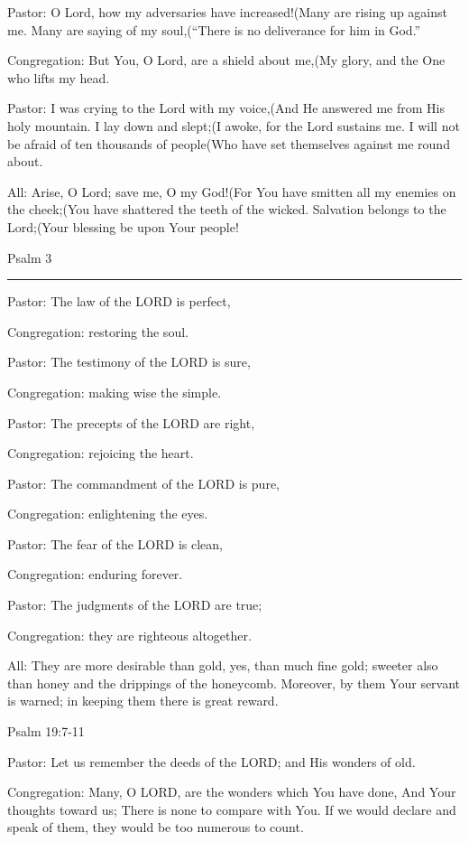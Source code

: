 \documentclass[]{book}
\begin{document}
Pastor: O Lord, how my adversaries have increased!(Many are rising up
against me. Many are saying of my soul,(``There is no deliverance for
him in God.''

Congregation: But You, O Lord, are a shield about me,(My glory, and the
One who lifts my head.

Pastor: I was crying to the Lord with my voice,(And He answered me from
His holy mountain. I lay down and slept;(I awoke, for the Lord sustains
me. I will not be afraid of ten thousands of people(Who have set
themselves against me round about.

All: Arise, O Lord; save me, O my God!(For You have smitten all my
enemies on the cheek;(You have shattered the teeth of the wicked.
Salvation belongs to the Lord;(Your blessing be upon Your people!

Psalm 3 \textbar{}

\begin{center}\rule{0.5\linewidth}{\linethickness}\end{center}

Pastor: The law of the LORD is perfect,

Congregation: restoring the soul.

Pastor: The testimony of the LORD is sure,

Congregation: making wise the simple.

Pastor: The precepts of the LORD are right,

Congregation: rejoicing the heart.

Pastor: The commandment of the LORD is pure,

Congregation: enlightening the eyes.

Pastor: The fear of the LORD is clean,

Congregation: enduring forever.

Pastor: The judgments of the LORD are true;

Congregation: they are righteous altogether.

All: They are more desirable than gold, yes, than much fine gold;
sweeter also than honey and the drippings of the honeycomb. Moreover, by
them Your servant is warned; in keeping them there is great reward.

Psalm 19:7-11 \textbar{}

Pastor: Let us remember the deeds of the LORD; and His wonders of old.

Congregation: Many, O LORD, are the wonders which You have done, And
Your thoughts toward us; There is none to compare with You. If we would
declare and speak of them, they would be too numerous to count.
\end{document}
